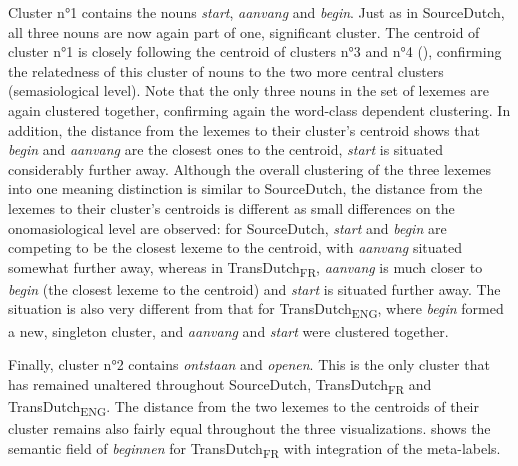 Cluster n°1 contains the nouns \textit{start}, \textit{aanvang} and \textit{begin}. Just as in SourceDutch, all three nouns are now again part of one, significant cluster. The centroid of cluster n°1 is closely following the centroid of clusters n°3 and n°4 (), confirming the relatedness of this cluster of nouns to the two more central clusters (semasiological level). Note that the only three nouns in the set of lexemes are again clustered together, confirming again the word-class dependent clustering. In addition, the distance from the lexemes to their cluster’s centroid shows that \textit{begin} and \textit{aanvang} are the closest ones to the centroid, \textit{start} is situated considerably further away. Although the overall clustering of the three lexemes into one meaning distinction is similar to SourceDutch, the distance from the lexemes to their cluster’s centroids is different as small differences on the onomasiological level are observed: for SourceDutch, \textit{start} and \textit{begin} are competing to be the closest lexeme to the centroid, with \textit{aanvang} situated somewhat further away, whereas in TransDutch\textsubscript{FR}, \textit{aanvang} is much closer to \textit{begin} (the closest lexeme to the centroid) and \textit{start} is situated further away. The situation is also very different from that for TransDutch\textsubscript{ENG}, where \textit{begin} formed a new, singleton cluster, and \textit{aanvang} and \textit{start} were clustered together.

Finally, cluster n°2 contains \textit{ontstaan} and \textit{openen}. This is the only cluster that has remained unaltered throughout SourceDutch, TransDutch\textsubscript{FR} and TransDutch\textsubscript{ENG}. The distance from the two lexemes to the centroids of their cluster remains also fairly equal throughout the three visualizations.  shows the semantic field of \textit{beginnen} for TransDutch\textsubscript{FR} with integration of the meta-labels.

